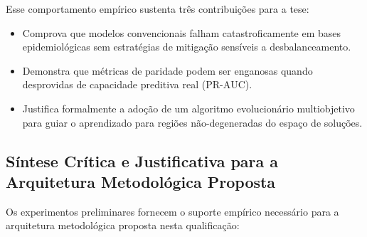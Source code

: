 Esse comportamento empírico sustenta três contribuições para a tese:
\begin{itemize}
    \item Comprova que modelos convencionais falham catastroficamente em bases epidemiológicas sem estratégias de mitigação sensíveis a desbalanceamento.
    \item Demonstra que métricas de paridade podem ser enganosas quando desprovidas de capacidade preditiva real ($\text{PR-AUC}$).
    \item Justifica formalmente a adoção de um algoritmo evolucionário multiobjetivo para guiar o aprendizado para regiões não-degeneradas do espaço de soluções.
\end{itemize}

\subsection{Síntese Crítica e Justificativa para a Arquitetura Metodológica Proposta}
\label{subsec:sintese_justificativa}

Os experimentos preliminares fornecem o suporte empírico necessário para a arquitetura metodológica proposta nesta qualificação:

